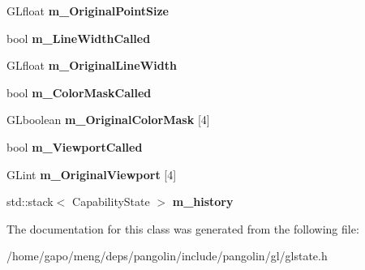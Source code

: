 \begin{DoxyCompactItemize}
\item 
G\+Lfloat {\bfseries m\+\_\+\+Original\+Point\+Size}\hypertarget{classpangolin_1_1_gl_state_a10ef0c06828799998dba1e6e2811760b}{}\label{classpangolin_1_1_gl_state_a10ef0c06828799998dba1e6e2811760b}

\item 
bool {\bfseries m\+\_\+\+Line\+Width\+Called}\hypertarget{classpangolin_1_1_gl_state_a05154114643249c161ba4414028f1172}{}\label{classpangolin_1_1_gl_state_a05154114643249c161ba4414028f1172}

\item 
G\+Lfloat {\bfseries m\+\_\+\+Original\+Line\+Width}\hypertarget{classpangolin_1_1_gl_state_ae76ecedcea967fb5e7d7459675e530cf}{}\label{classpangolin_1_1_gl_state_ae76ecedcea967fb5e7d7459675e530cf}

\item 
bool {\bfseries m\+\_\+\+Color\+Mask\+Called}\hypertarget{classpangolin_1_1_gl_state_a113bff8417500bb8d9794e0dd5cb06be}{}\label{classpangolin_1_1_gl_state_a113bff8417500bb8d9794e0dd5cb06be}

\item 
G\+Lboolean {\bfseries m\+\_\+\+Original\+Color\+Mask} \mbox{[}4\mbox{]}\hypertarget{classpangolin_1_1_gl_state_ae509573e080448c1577e816416bb8dba}{}\label{classpangolin_1_1_gl_state_ae509573e080448c1577e816416bb8dba}

\item 
bool {\bfseries m\+\_\+\+Viewport\+Called}\hypertarget{classpangolin_1_1_gl_state_acca68f34837cc0a220433f5eba2c72ba}{}\label{classpangolin_1_1_gl_state_acca68f34837cc0a220433f5eba2c72ba}

\item 
G\+Lint {\bfseries m\+\_\+\+Original\+Viewport} \mbox{[}4\mbox{]}\hypertarget{classpangolin_1_1_gl_state_a3ff4eec68e8a21ce1b74ecad53130970}{}\label{classpangolin_1_1_gl_state_a3ff4eec68e8a21ce1b74ecad53130970}

\item 
std\+::stack$<$ Capability\+State $>$ {\bfseries m\+\_\+history}\hypertarget{classpangolin_1_1_gl_state_a5bc01b0a47792e842e83c674c71293ff}{}\label{classpangolin_1_1_gl_state_a5bc01b0a47792e842e83c674c71293ff}

\end{DoxyCompactItemize}


The documentation for this class was generated from the following file\+:\begin{DoxyCompactItemize}
\item 
/home/gapo/meng/deps/pangolin/include/pangolin/gl/glstate.\+h\end{DoxyCompactItemize}

